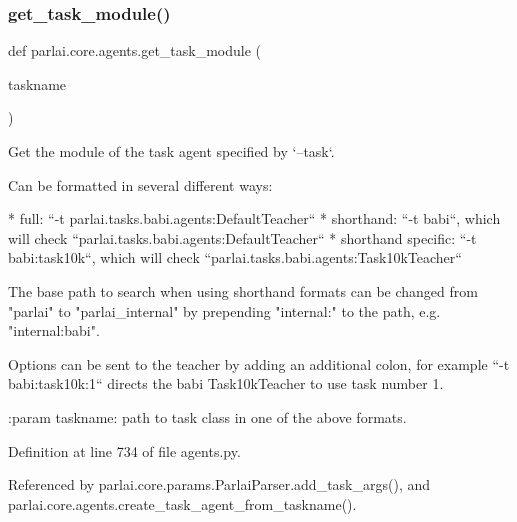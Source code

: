 \subsubsection{\texorpdfstring{get\+\_\+task\+\_\+module()}{get\_task\_module()}}
{\footnotesize\ttfamily def parlai.\+core.\+agents.\+get\+\_\+task\+\_\+module (\begin{DoxyParamCaption}\item[{}]{taskname }\end{DoxyParamCaption})}

\begin{DoxyVerb}Get the module of the task agent specified by `--task`.

Can be formatted in several different ways:

* full: ``-t parlai.tasks.babi.agents:DefaultTeacher``
* shorthand: ``-t babi``, which will check
    ``parlai.tasks.babi.agents:DefaultTeacher``
* shorthand specific: ``-t babi:task10k``, which will check
    ``parlai.tasks.babi.agents:Task10kTeacher``

The base path to search when using shorthand formats can be changed from
"parlai" to "parlai_internal" by prepending "internal:" to the path, e.g.
"internal:babi".

Options can be sent to the teacher by adding an additional colon,
for example ``-t babi:task10k:1`` directs the babi Task10kTeacher to use
task number 1.

:param taskname: path to task class in one of the above formats.
\end{DoxyVerb}
 

Definition at line 734 of file agents.\+py.



Referenced by parlai.\+core.\+params.\+Parlai\+Parser.\+add\+\_\+task\+\_\+args(), and parlai.\+core.\+agents.\+create\+\_\+task\+\_\+agent\+\_\+from\+\_\+taskname().

